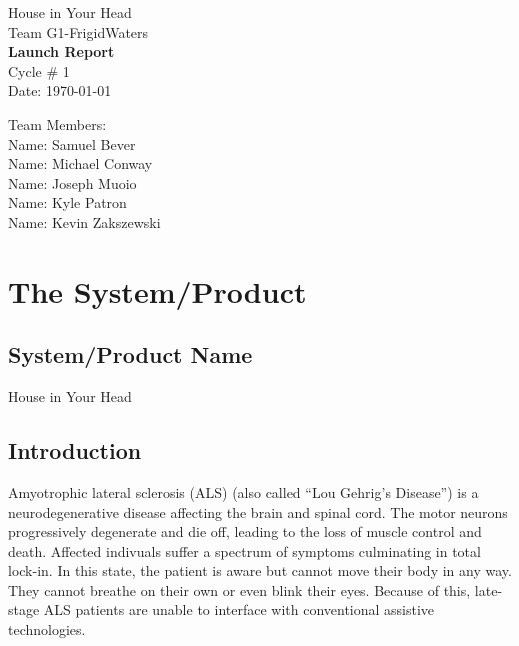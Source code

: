 \documentclass{report}
\begin{document}
\begin{titlepage}
    \begin{center}
        \begin{huge}
        House in Your Head \\[1cm]
        Team G1-FrigidWaters \\[2.2cm]
        { \bfseries Launch Report } \\[1cm]
        Cycle \# 1\\[2.2cm]
        Date: \required\today\\[1cm]
        \end{huge}
    \end{center}
    \null \vfill
    \begin{large}
        Team Members: \\[0.5cm]
        Name: Samuel Bever\\[0.5cm]
        Name: Michael Conway\\[0.5cm]
        Name: Joseph Muoio\\[0.5cm]
        Name: Kyle Patron\\[0.5cm]
        Name: Kevin Zakszewski
    \end{large}
\end{titlepage}

\section*{\centering The System/Product}

\subsection*{System/Product Name}

House in Your Head

\subsection*{Introduction}

Amyotrophic lateral sclerosis (ALS) (also called ``Lou Gehrig's Disease'') is
a neurodegenerative disease affecting the brain and spinal cord. The motor
neurons progressively degenerate and die off, leading to the loss of muscle
control and death. Affected indivuals suffer a spectrum of symptoms
culminating in total lock-in. In this state, the patient is aware but cannot
move their body in any way. They cannot breathe on their own or even blink
their eyes. Because of this, late-stage ALS patients are unable to interface
with conventional assistive technologies. \cite{ALSsource}
\end{document}
